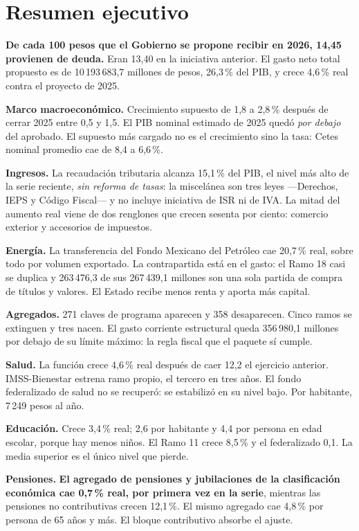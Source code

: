 \chapter*{Resumen ejecutivo}

\textbf{De cada 100 pesos que el Gobierno se propone recibir en 2026, 14,45 provienen de
deuda.} Eran 13,40 en la iniciativa anterior. El gasto neto total propuesto es de
10\,193\,683,7 millones de pesos, 26,3\,\% del PIB, y crece 4,6\,\% real contra el proyecto de
2025.

\textbf{Marco macroeconómico.} Crecimiento supuesto de 1,8 a 2,8\,\% después de cerrar 2025
entre 0,5 y 1,5. El PIB nominal estimado de 2025 quedó \emph{por debajo} del aprobado. El
supuesto más cargado no es el crecimiento sino la tasa: Cetes nominal promedio cae de 8,4 a
6,6\,\%.

\textbf{Ingresos.} La recaudación tributaria alcanza 15,1\,\% del PIB, el nivel más alto de la
serie reciente, \emph{sin reforma de tasas}: la miscelánea son tres leyes ---Derechos, IEPS y
Código Fiscal--- y no incluye iniciativa de ISR ni de IVA. La mitad del aumento real viene de
dos renglones que crecen sesenta por ciento: comercio exterior y accesorios de impuestos.

\textbf{Energía.} La transferencia del Fondo Mexicano del Petróleo cae 20,7\,\% real, sobre
todo por volumen exportado. La contrapartida está en el gasto: el Ramo 18 casi se duplica y
263\,476,3 de sus 267\,439,1 millones son una sola partida de compra de títulos y valores. El
Estado recibe menos renta y aporta más capital.

\textbf{Agregados.} 271 claves de programa aparecen y 358 desaparecen. Cinco ramos se
extinguen y tres nacen. El gasto corriente estructural queda 356\,980,1 millones por debajo de
su límite máximo: la regla fiscal que el paquete sí cumple.

\textbf{Salud.} La función crece 4,6\,\% real después de caer 12,2 el ejercicio anterior.
IMSS-Bienestar estrena ramo propio, el tercero en tres años. El fondo federalizado de salud no
se recuperó: se estabilizó en su nivel bajo. Por habitante, 7\,249 pesos al año.

\textbf{Educación.} Crece 3,4\,\% real; 2,6 por habitante y 4,4 por persona en edad escolar,
porque hay menos niños. El Ramo 11 crece 8,5\,\% y el federalizado 0,1. La media superior es el
único nivel que pierde.

\textbf{Pensiones.} \textbf{El agregado de pensiones y jubilaciones de la clasificación
económica cae 0,7\,\% real, por primera vez en la serie}, mientras las pensiones no
contributivas crecen 12,1\,\%. El mismo agregado cae 4,8\,\% por persona de 65 años y más. El
bloque contributivo absorbe el ajuste.

